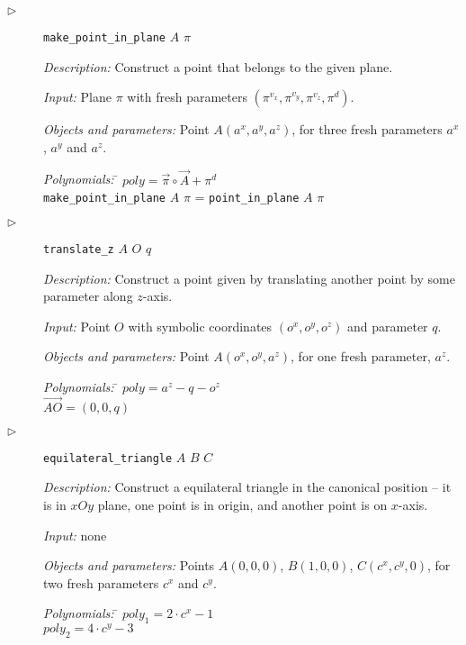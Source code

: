 \documentclass{aicom2e}
\begin{document}
\begin{description}
\item[$\triangleright$] {\tt make\_point\_in\_plane} $A$ $\pi$ 

  {\em Description:} Construct a point that belongs to the given
  plane.
  
  {\em Input:} Plane $\pi$ with fresh parameters $(\pi^{v_x},
  \pi^{v_y}, \pi^{v_z}, \pi^{d})$.

  {\em Objects and parameters:} Point $A(a^x, a^y, a^z)$, for three
  fresh parameters $a^x$, $a^y$ and $a^z$.

\begin{tabbing}
{\em Polynomials:} \= $poly = \overrightarrow{\pi} \circ \overrightarrow{A} + \pi^{d}$ \\
                   \> {\tt make\_point\_in\_plane} $A$ $\pi$  = {\tt point\_in\_plane} $A$ $\pi$

\end{tabbing}

\item[$\triangleright$] {\tt translate\_z} $A$ $O$ $q$

  {\em Description:} Construct a point given by translating another
  point by some parameter along $z$-axis.
  
  {\em Input:} Point $O$ with symbolic coordinates $(o^x, o^y, o^z)$
  and parameter $q$.

  {\em Objects and parameters:} Point $A(o^x, o^y, a^z)$, for one
  fresh parameter, $a^z$.

\begin{tabbing}
{\em Polynomials:} \= $poly = a^z - q - o^z$ \\
                   $\overrightarrow{AO} = (0, 0, q)$
\end{tabbing}
\item[$\triangleright$] {\tt equilateral\_triangle} $A$ $B$ $C$

  {\em Description:} Construct a equilateral triangle in the canonical
  position -- it is in $xOy$ plane, one point is in origin, and
  another point is on $x$-axis.
  
  {\em Input:} none

  {\em Objects and parameters:} Points $A(0, 0, 0)$, $B(1, 0, 0)$,
  $C(c^x, c^y, 0)$, for two fresh parameters $c^x$ and $c^y$.

\begin{tabbing}
{\em Polynomials:} \= $poly_1 = 2\cdot c^x - 1$ \\
                   \> $poly_2 = 4\cdot c^y - 3$
\end{tabbing}



\end{description}
\end{document}

